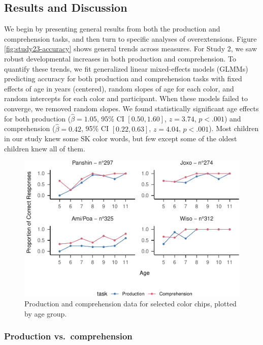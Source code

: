 \documentclass[
  english,
  ,man,floatsintext]{apa6}
\begin{document}
\hypertarget{results-and-discussion-1}{%
\subsection{Results and Discussion}\label{results-and-discussion-1}}

We begin by presenting general results from both the production and comprehension tasks, and then turn to specific analyses of overextensions. Figure \ref{fig:study23-accuracy} shows general trends across measures. For Study 2, we saw robust developmental increases in both production and comprehension. To quantify these trends, we fit generalized linear mixed-effects models (GLMMs) predicting accuracy for both production and comprehension tasks with fixed effects of age in years (centered), random slopes of age for each color, and random intercepts for each color and participant. When these models failed to converge, we removed random slopes. We found statistically significant age effects for both production (\(\hat{\beta} = 1.05\), 95\% CI \([0.50, 1.60]\), \(z = 3.74\), \(p < .001\)) and comprehension (\(\hat{\beta} = 0.42\), 95\% CI \([0.22, 0.63]\), \(z = 4.04\), \(p < .001\)). Most children in our study knew some SK color words, but few except some of the oldest children knew all of them.

\begin{figure}
\centering
\includegraphics{amazon_color_files/figure-latex/study2-task-compare-plot-1.pdf}
\caption{\label{fig:study2-task-compare-plot}Production and comprehension data for selected color chips, plotted by age group.}
\end{figure}

\hypertarget{production-vs.-comprehension}{%
\subsubsection{Production vs.~comprehension}\label{production-vs.-comprehension}}
\end{document}
